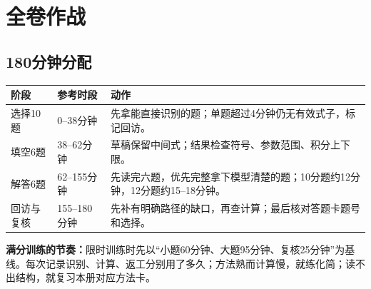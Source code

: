 \chapter{全卷作战}
\section{180分钟分配}
\begin{tabularx}{\textwidth}{p{23mm}p{25mm}Y}
\toprule 阶段&参考时段&动作\\\midrule
选择10题&0--38分钟&先拿能直接识别的题；单题超过4分钟仍无有效式子，标记回访。\\
填空6题&38--62分钟&草稿保留中间式；结果检查符号、参数范围、积分上下限。\\
解答6题&62--155分钟&先读完六题，优先完整拿下模型清楚的题；10分题约12分钟，12分题约15--18分钟。\\
回访与复核&155--180分钟&先补有明确路径的缺口，再查计算；最后核对答题卡题号和选择。\\\bottomrule
\end{tabularx}
\textbf{满分训练的节奏：}限时训练时先以“小题60分钟、大题95分钟、复核25分钟”为基线。每次记录识别、计算、返工分别用了多久；方法熟而计算慢，就练化简；读不出结构，就复习本册对应方法卡。

